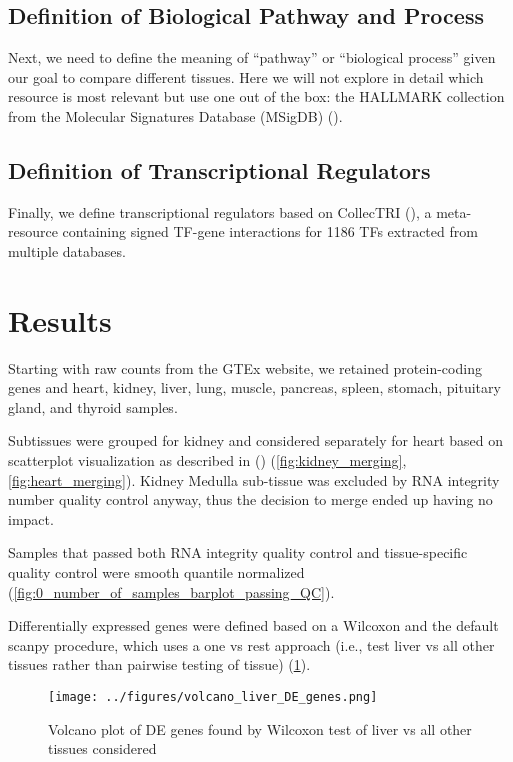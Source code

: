 \documentclass{article}
\begin{document}
\subsection{Definition of Biological Pathway and Process}

Next, we need to define the meaning of “pathway” or “biological process” given our goal to compare different tissues. Here we will not explore in detail which resource is most relevant but use one out of the box: the HALLMARK collection from the Molecular Signatures Database (MSigDB) (\cite{Liberzon2011-ex}).

\subsection{Definition of Transcriptional Regulators}

Finally, we define transcriptional regulators based on CollecTRI (\cite{Muller-Dott2023-ve}), a meta-resource containing signed TF-gene interactions for 1186 TFs extracted from multiple databases.


\section{Results}

Starting with raw counts from the GTEx website, we retained protein-coding genes and heart, kidney, liver, lung, muscle, pancreas, spleen, stomach, pituitary gland, and thyroid samples.

Subtissues were grouped for kidney and considered separately for heart based on scatterplot visualization as described in (\cite{Paulson2017-jv}) (\ref{fig:kidney_merging}, \ref{fig:heart_merging}). Kidney Medulla sub-tissue was excluded by RNA integrity number quality control anyway, thus the decision to merge ended up having no impact.

Samples that passed both RNA integrity quality control and tissue-specific quality control were smooth quantile normalized (\ref{fig:0_number_of_samples_barplot_passing_QC}).


Differentially expressed genes were defined based on a Wilcoxon and the default scanpy procedure, which uses a one vs rest approach (i.e., test liver vs all other tissues rather than pairwise testing of tissue) (\ref{fig:volcano_liver_DE_genes}). 

\begin{figure}[htbp]
  \centering
  \texttt{[image: ../figures/volcano\_liver\_DE\_genes.png]}
  \caption{Volcano plot of DE genes found by Wilcoxon test of liver vs all other tissues considered}
  \label{fig:volcano_liver_DE_genes}
\end{figure}
\FloatBarrier
\end{document}
